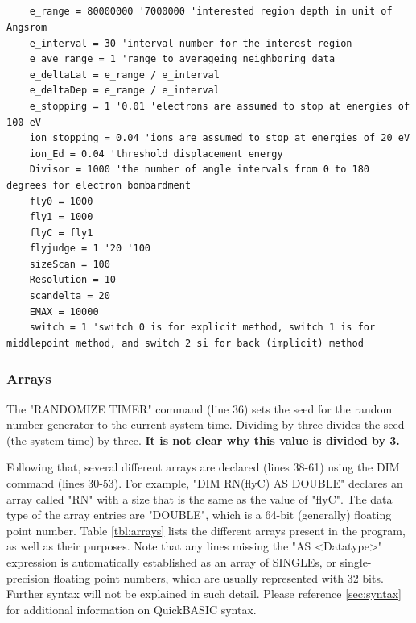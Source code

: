 \documentclass[10pt, reqno]{exam}
\begin{document}
\begin{verbatim}
    
    
    

    e_range = 80000000 '7000000 'interested region depth in unit of Angsrom
    e_interval = 30 'interval number for the interest region
    e_ave_range = 1 'range to averageing neighboring data
    e_deltaLat = e_range / e_interval
    e_deltaDep = e_range / e_interval
    e_stopping = 1 '0.01 'electrons are assumed to stop at energies of 100 eV
    ion_stopping = 0.04 'ions are assumed to stop at energies of 20 eV
    ion_Ed = 0.04 'threshold displacement energy
    Divisor = 1000 'the number of angle intervals from 0 to 180 degrees for electron bombardment
    fly0 = 1000
    fly1 = 1000
    flyC = fly1
    flyjudge = 1 '20 '100
    sizeScan = 100
    Resolution = 10
    scandelta = 20
    EMAX = 10000
    switch = 1 'switch 0 is for explicit method, switch 1 is for middlepoint method, and switch 2 si for back (implicit) method
\end{verbatim}
\subsubsection{Arrays}

The "RANDOMIZE TIMER" command (line 36) sets the seed for the random number generator to the current system time. Dividing by three divides the seed (the system time) by three. \textbf{It is not clear why this value is divided by 3.} \par

Following that, several different arrays are declared (lines 38-61) using the DIM command (lines 30-53). For example, "DIM RN(flyC) AS DOUBLE" declares an array called "RN" with a size that is the same as the value of "flyC". The data type of the array entries are "DOUBLE", which is a 64-bit (generally) floating point number. Table \ref{tbl:arrays} lists the different arrays present in the program, as well as their purposes. Note that any lines missing the "AS <Datatype>" expression is automatically established as an array of SINGLEs, or single-precision floating point numbers, which are usually represented with 32 bits. Further syntax will not be explained in such detail. Please reference \ref{sec:syntax} for additional information on QuickBASIC syntax. \par
\end{document}
